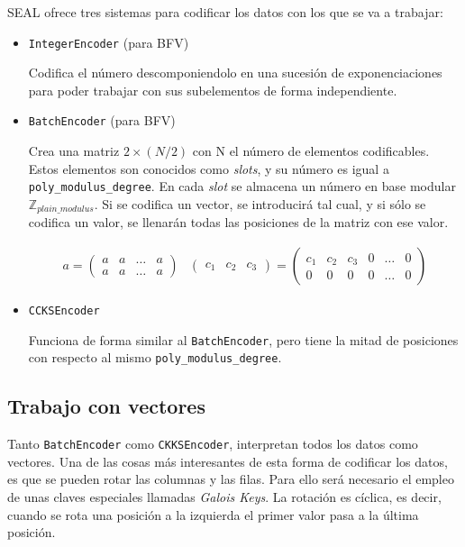 SEAL ofrece tres sistemas para codificar los datos con los que se va a trabajar:
\begin{itemize}
    \item \verb|IntegerEncoder| (para BFV)

    Codifica el número descomponiendolo en una sucesión de exponenciaciones para poder trabajar con sus subelementos de forma independiente.

    \item \verb|BatchEncoder| (para BFV)

    Crea una matriz $2 \times (N/2)$ con N el número de elementos codificables. Estos elementos son conocidos como \textit{slots}, y su número es igual a \verb|poly_modulus_degree|. En cada \textit{slot} se almacena un número en base modular $\mathbb{Z}_{plain\_modulus}$. Si se codifica un vector, se introducirá tal cual, y si sólo se codifica un valor, se llenarán todas las posiciones de la matriz con ese valor.

    \begin{gather}
      a =
      \begin{pmatrix}
        a & a & \hdots & a \\
        a & a & \hdots & a
      \end{pmatrix} &
      \begin{pmatrix}
        c_1 & c_2 & c_3
      \end{pmatrix}
      =
      \begin{pmatrix}
        c_1 & c_2   & c_3   & 0     & \hdots & 0 \\
        0   & 0     & 0     & 0     & \hdots & 0
      \end{pmatrix}
    \end{gather}

    \item \verb|CCKSEncoder|

    Funciona de forma similar al \verb|BatchEncoder|, pero tiene la mitad de posiciones con respecto al mismo \verb|poly_modulus_degree|.
\end{itemize}{}

\subsection{Trabajo con vectores}

Tanto \verb|BatchEncoder| como \verb|CKKSEncoder|, interpretan todos los datos como vectores. Una de las cosas más interesantes de esta forma de codificar los datos, es que se pueden rotar las columnas y las filas. Para ello será necesario el empleo de unas claves especiales llamadas \textit{Galois Keys}. La rotación es cíclica, es decir, cuando se rota una posición a la izquierda el primer valor pasa a la última posición.

